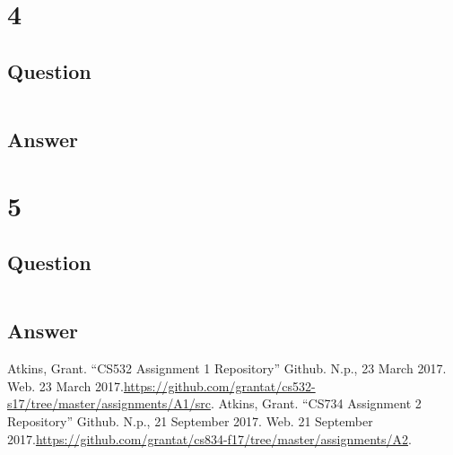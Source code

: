 \documentclass[letterpaper,11pt]{article}
\begin{document}
\clearpage


\section*{4}

\subsection*{Question}

\begin{verbatim}

\end{verbatim}

\subsection*{Answer}


\clearpage


\section*{5}

\subsection*{Question}

\begin{verbatim}

\end{verbatim}

\subsection*{Answer}


\clearpage



\begin{thebibliography}{9}
Atkins, Grant. ``CS532 Assignment 1 Repository'' Github. N.p., 23 March 2017. Web. 23 March 2017.\url{https://github.com/grantat/cs532-s17/tree/master/assignments/A1/src}.
Atkins, Grant. ``CS734 Assignment 2 Repository'' Github. N.p., 21 September 2017. Web. 21 September 2017.\url{https://github.com/grantat/cs834-f17/tree/master/assignments/A2}.
\end{thebibliography}
\end{document}
